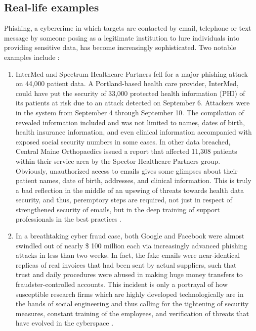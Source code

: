 \subsection{Real-life examples}

Phishing, a cybercrime in which targets are contacted by email, telephone or text message by someone posing as a legitimate institution to lure individuals into providing sensitive data, has become increasingly sophisticated. Two notable examples include :

\begin{enumerate}
    \item InterMed and Spectrum Healthcare Partners fell for a major phishing attack on 44,000 patient data. A Portland-based health care provider, InterMed, could have put the security of 33,000 protected health information (PHI) of its patients at risk due to an attack detected on September 6. Attackers were in the system from September 4 through September 10. The compilation of revealed information included and was not limited to names, dates of birth, health insurance information, and even clinical information accompanied with exposed social security numbers in some cases. In other data breached, Central Maine Orthopaedics issued a report that affected 11,308 patients within their service area by the Spector Healthcare Partners group. Obviously, unauthorized access to emails gives some glimpses about their patient names, date of birth, addresses, and clinical information. This is truly a bad reflection in the middle of an upswing of threats towards health data security, and thus, peremptory steps are required, not just in respect of strengthened security of emails, but in the deep training of support professionals in the best practices \cite{HIPAAJournal2020Phishing} .
    \item In a breathtaking cyber fraud case, both Google and Facebook were almost swindled out of nearly \$ 100 million each via increasingly advanced phishing attacks in less than two weeks. In fact, the fake emails were near-identical replicas of real invoices that had been sent by actual suppliers, such that trust and daily procedures were abused in making huge money transfers to fraudster-controlled accounts. This incident is only a portrayal of how susceptible research firms which are highly developed technologically are in the hands of social engineering and thus calling for the tightening of security measures, constant training of the employees, and verification of threats that have evolved in the cyberspace \cite{CNBC2019Phishing}.
\end{enumerate}

